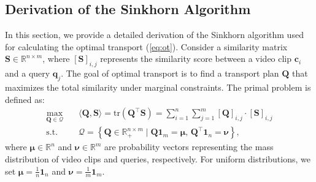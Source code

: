 \subsection{Derivation of the Sinkhorn Algorithm}
\label{sec:sinkhorn_derivation}
In this section, we provide a detailed derivation of the Sinkhorn algorithm used for calculating the optimal transport (\cref{eq:ot}). 
Consider a similarity matrix $\mathbf{S} \in \mathbb{R}^{n \times m}$, where $[\mathbf{S}]_{i,j}$ represents the similarity score between a video clip $\mathbf{c}_i$ and a query $\mathbf{q}_j$. The goal of optimal transport is to find a transport plan $\mathbf{Q}$ that maximizes the total similarity under marginal constraints. The primal problem is defined as:
\begin{equation}
\begin{aligned}
    \max_{\mathbf{Q} \in \mathcal{Q}} \quad & \langle \mathbf{Q}, \mathbf{S} \rangle = \text{tr}(\mathbf{Q}^\top \mathbf{S}) = \sum_{i=1}^{n} \sum_{j=1}^{m} [\mathbf{Q}]_{i,j} \cdot [\mathbf{S}]_{i,j} \\
    \text{s.t.} \quad & \mathcal{Q} = \left\{ \mathbf{Q} \in \mathbb{R}_+^{n \times m} \mid \mathbf{Q}\mathbf{1}_m = \boldsymbol{\mu}, \, \mathbf{Q}^\top \mathbf{1}_n = \boldsymbol{\nu} \right\},
\end{aligned}
\label{eq:ot_primal}
\end{equation}
where $\boldsymbol{\mu} \in \mathbb{R}^n$ and $\boldsymbol{\nu} \in \mathbb{R}^m$ are probability vectors representing the mass distribution of video clips and queries, respectively. For uniform distributions, we set $\boldsymbol{\mu} = \frac{1}{n}\mathbf{1}_n$ and $\boldsymbol{\nu} = \frac{1}{m}\mathbf{1}_m$.

